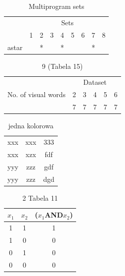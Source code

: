 \documentclass{article}
\begin{document}
    \begin{table}
        \centering
        \caption{Multiprogram sets}
        \label{multiprogram}
        \begin{tabular}{c|c|c|c|c|c|c|c|c|}
            \cline{2-9}
             & \multicolumn{8}{|c|}{Sets}\\
            \cline{2-9}
             & 1 & 2 & 3 & 4 & 5 & 6 & 7 & 8\\
            \hline
            \multicolumn{1}{|c|}{astar} & & * &  & * &  &  & * &\\
            \hline
        \end{tabular}
    \end{table}
		
		
		
\begin{table}
\begin{center}
			\begin{tabular}{c|c|c|c|c|c|}
			\cline{2-6}
			\multirow{3}{*}{No. of visual words} & \multicolumn{5}{|c|}{Dataset} \\ \cline{2-6}
			  & 2 & 3 & 4 & 5 & 6 \\ \hline
			  & 7 & 7 & 7 & 7 & 7 \\ \hline
			
\end{tabular}
\caption{9 (Tabela 15) }
\end{center}
\end{table}













\begin{table}
\begin{center}
\begin{tabular}{ccc}
xxx & xxx & 333 \\
xxx & xzx & fdf \\
yyy & zzz & gdf \\
yyy & zzz & dgd \\
\end{tabular}
\caption{jedna kolorowa}

\end{center}
\end{table}

\begin{table}
\begin{center}
\begin{tabular}{c|c|c}
\hline
\hline 
$x_{1}$ & $x_{2}$ & ($x_{1}$AND$x_{2}$)  \\ \hline
1 & 1 & 1 \\ 
1 & 0 & 0 \\
0 & 1 & 0 \\
0 & 0 & 0 \\
\hline \hline
\end{tabular}
\caption{2 Tabela 11 }
\end{center}
\end{table}
\end{document}
